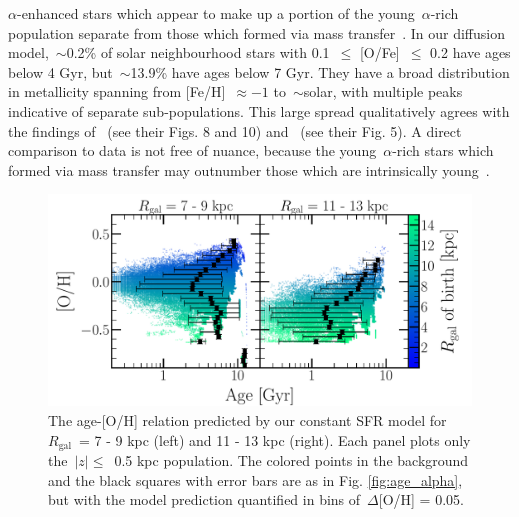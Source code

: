 \documentclass[draft2.tex]{subfiles}
\begin{document}
$\alpha$-enhanced stars which appear to make up a portion of the 
young~$\alpha$-rich population separate from those which formed via mass 
transfer~\citep{Yong2016, Hekker2019}. 
In our diffusion model,~$\sim$0.2\% of solar neighbourhood stars with 0.1~$\leq$ 
[O/Fe]~$\leq$ 0.2 have ages below 4 Gyr, but~$\sim$13.9\% have ages below 7 Gyr. 
They have a broad distribution in metallicity spanning from [Fe/H]~$\approx-1$ 
to~$\sim$solar, with multiple peaks indicative of separate sub-populations. 
This large spread qualitatively agrees with the findings 
of~\citet{SilvaAguirre2018} (see their Figs. 8 and 10) and~\citet{Miglio2021} 
(see their Fig. 5). 
A direct comparison to data is not free of nuance, because the 
young~$\alpha$-rich stars which formed via mass transfer may outnumber 
those which are intrinsically young~\citep{Miglio2021}. 

\begin{figure} 
\centering 
\includegraphics[scale = 0.35]{amr_static_o.pdf} 
\caption{The age-[O/H] relation predicted by our constant SFR model for 
$R_\text{gal}$~= 7 - 9 kpc (left) and 11 - 13 kpc (right). Each panel plots 
only the~$\left|z\right|\leq$~0.5 kpc population. The colored points in the 
background and the black squares with error bars are as in Fig. 
\ref{fig:age_alpha}, but with the model prediction quantified in bins 
of~$\Delta$[O/H] = 0.05. } 
\label{fig:age_oh_static} 
\end{figure} 
\end{document}

